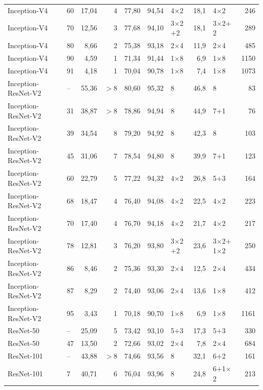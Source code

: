 {\begin{longtable}{@{}llrrrrlrlr@{}}
Inception-V4 & 60 & 17,04 & 4 & 77,80 & 94,54 & 4$\times$2 & 18,1 & 4$\times$2 & 246 \\
Inception-V4 & 70 & 12,56 & 3 & 77,68 & 94,10 & 3$\times$2$+$2 & 18,1 & 3$\times$2$+$2 & 289 \\
Inception-V4 & 80 & 8,66 & 2 & 75,38 & 93,18 & 2$\times$4 & 11,9 & 2$\times$4 & 485 \\
Inception-V4 & 90 & 4,59 & 1 & 71,34 & 91,44 & 1$\times$8 & 6,9 & 1$\times$8 & 1150 \\
Inception-V4 & 91 & 4,18 & 1 & 70,04 & 90,78 & 1$\times$8 & 7,4 & 1$\times$8 & 1073 \\
\addlinespace[2pt]
Inception-ResNet-V2 & -- & 55,36 & $>8$ & 80,60 & 95,32 & 8 & 46,8 & 8 & 83 \\
Inception-ResNet-V2 & 31 & 38,87 & $>8$ & 78,86 & 94,94 & 8 & 44,9 & 7$+$1 & 76 \\
Inception-ResNet-V2 & 39 & 34,54 & 8 & 79,20 & 94,92 & 8 & 42,3 & 8 & 103 \\
Inception-ResNet-V2 & 45 & 31,06 & 7 & 78,54 & 94,80 & 8 & 39,9 & 7$+$1 & 123 \\
Inception-ResNet-V2 & 60 & 22,79 & 5 & 77,22 & 94,32 & 4$\times$2 & 26,8 & 5$+$3 & 164 \\
Inception-ResNet-V2 & 68 & 18,47 & 4 & 76,40 & 94,08 & 4$\times$2 & 22,5 & 4$\times$2 & 223 \\
Inception-ResNet-V2 & 70 & 17,40 & 4 & 76,70 & 94,18 & 4$\times$2 & 21,7 & 4$\times$2 & 217 \\
Inception-ResNet-V2 & 78 & 12,81 & 3 & 76,20 & 93,80 & 3$\times$2$+$2 & 23,6 & 3$\times$2$+$1$\times$2 & 250 \\
Inception-ResNet-V2 & 86 & 8,46 & 2 & 75,36 & 93,30 & 2$\times$4 & 12,5 & 2$\times$4 & 434 \\
Inception-ResNet-V2 & 87 & 8,29 & 2 & 74,40 & 93,06 & 2$\times$4 & 13,6 & 1$\times$8 & 412 \\
Inception-ResNet-V2 & 95 & 3,43 & 1 & 70,18 & 90,70 & 1$\times$8 & 6,9 & 1$\times$8 & 1161 \\
\addlinespace[2pt]
ResNet-50 & -- & 25,09 & 5 & 73,42 & 93,10 & 5$+$3 & 17,3 & 5$+$3 & 330 \\
ResNet-50 & 47 & 13,50 & 2 & 72,66 & 93,02 & 2$\times$4 & 7,8 & 2$\times$4 & 684 \\
\addlinespace[2pt]
ResNet-101 & -- & 43,88 & $>8$ & 74,66 & 93,56 & 8 & 32,1 & 6$+$2 & 161 \\
ResNet-101 & 7 & 40,71 & 6 & 76,04 & 93,96 & 8 & 24,8 & 6$+$1$\times$2 & 213 \\

\end{longtable}}
